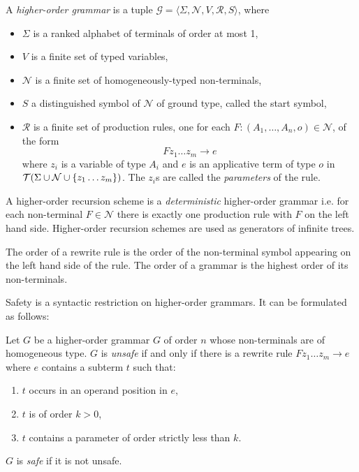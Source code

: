 \begin{dfn}
A \emph{higher-order grammar} is a tuple $\mathcal{G} = \langle \Sigma, \mathcal{N}, V, \mathcal{R}, S \rangle$, where
\begin{itemize}
\item $\Sigma$ is a ranked alphabet of terminals of order at most 1,
\item $V$ is a finite set of typed variables,
\item $\mathcal{N}$ is a finite set of homogeneously-typed non-terminals,
\item $S$ a distinguished symbol of $\mathcal{N}$ of ground type, called the start symbol,
\item $\mathcal{R}$ is a finite set of production rules, one for each $F : (A_1, \ldots, A_n, o) \in \mathcal{N}$, of the form
    $$ F z_1 \ldots z_m \rightarrow e$$
where $z_i$ is a variable of type $A_i$ and $e$ is an applicative
term of type $o$ in $\mathcal{T}(\Sigma \cup \mathcal{N} \cup
\{z_1 \ldots z_m \} )$. The $z_i$s are called the \emph{parameters}
of the rule.
\end{itemize}
\end{dfn}
A higher-order recursion scheme is a \emph{deterministic} higher-order grammar i.e. for each non-terminal $F \in \mathcal{N}$ there is exactly one production rule with $F$ on the left hand side.
Higher-order recursion schemes are used as generators
of infinite trees.

The order of a rewrite rule is the order of the non-terminal symbol
appearing on the left hand side of the rule. The order of a grammar
is the highest order of its non-terminals.

Safety is a syntactic restriction on higher-order grammars. It can be formulated as
follows:
\begin{dfn}
  Let $G$ be a higher-order grammar $G$ of order $n$
    whose non-terminals are of homogeneous type.
    $G$ is \emph{unsafe} if and only if there is a rewrite rule $F z_1 \ldots z_m \rightarrow e$ where
   $e$ contains a subterm $t$ such that:
  \begin{enumerate}
    \item $t$ occurs in an operand position in $e$,
    \item $t$ is of order $k>0$,
    \item $t$ contains a parameter of order strictly less than $k$.
  \end{enumerate}
  $G$ is \emph{safe} if it is not unsafe.
\end{dfn}

